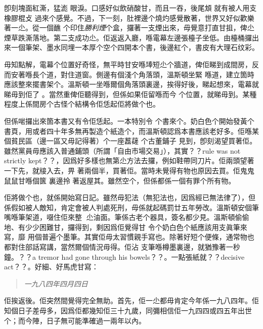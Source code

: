 卽刻塊面紅澌，猛滮
%
眼淚。口感好似飲硝酸甘，而且一吞，後尾䪴
%
就有被人用支橡膠棍攴
%
過來个感覺。不過，下一刻，肚裡邊个燒灼感覺散著，世界又好似歡樂著一尐。從一個䩌
%
个印住\emph{勝利煙}个盒，攞著一支煙出來，毋覺意打直甘抯，俾尐煙草跌澌落地。第二支成功尐。佢返返入廳，喺電幕左邊張檯子坐低。由檯桶攞出來一個筆架、墨水同埋一本厚个空个四開本个書，後邊紅个，書皮有大理石纹彩。

毋知點解，電幕个位置好奇怪，無平時甘安喺埲短尐个牆道，俾佢睇到成間房，反而安著喺長个道，對住道窗。側邊有個淺个角落頭，溫斯頓坐緊
%
喺道，建立箇時應該整來擺書架个。溫斯頓一坐喺爾個角落頭裏邊，挨得好後，睇起想來，電幕就睇毋到佢了
%
。當然重俾佢聽得到，但係如果佢留喺而今
%
个位置，就睇毋到。某種程度上係間房个古怪个結構令佢恁起佢將做个也。

但係啱攞出來箇本書又有令佢恁起。一本特別令
%
个書來个。奶白色个開始發黃个書頁，用或者四十年多無再製造个紙造个，而溫斯頓認爲本書應該老好多。佢喺某個貧民區（邊一區又毋記得著）个一座藞䕢
个古董鋪子
%
見到，卽刻渴望買著佢。雖然黨員毋應該入普通鋪頭（所謂「自由市場交易」），其實？？rule was not strictly kept？？，因爲好多樣也無第尐方法去攞，例如鞋帶同刀片。佢兩頭望著一下先，就𤗈入去，畀
%
著兩個半，買著佢。當時未覺得有物也原因去買。佢鬼鬼鼠鼠甘喺個篋
%
裏邊拎
%
著返屋其。雖然空个，但係都係一個有罪个所有物。

佢將做个也，就係開始寫日記。雖然毋犯法（無犯法也，因爲經已無法律了），但係假如被人敵知，肯定會被人判處死刑，毋係就起碼罰廿五年勞改。溫斯頓安個筆嘴喺筆架道，啜住佢來整𠞉
%
尐油面。筆係古老个器具，簽名都少見。溫斯頓偷偷地、有少少困難甘，攞得到，剩因爲佢覺得甘
%
令个奶白色个紙應該用支眞筆來寫，靡
%
用個普遍个墨筆。其實佢毋太習慣親手寫也。除著好短个便條，通常物也都對住部話寫講，當然爾個情況毋得。佢沾
%
支筆喺樽墨裏邊，就猶豫著一秒鐘。？？a tremor had gone through his bowels？？。一點張紙就？？decisive act？？。好細、好馬虎甘寫：
\begin{quote}\emph{
一九八四年四月四日
}\end{quote}%
佢挨返後。佢突然間覺得完全無助。首先，佢一尐都毋肯定今年係一九八四年。佢知個日子差毋多，因爲佢都幾知佢三十九歲，同彌相信佢一九四四或四五年出世个；而今陣，日子無可能準確過一兩年以內。

